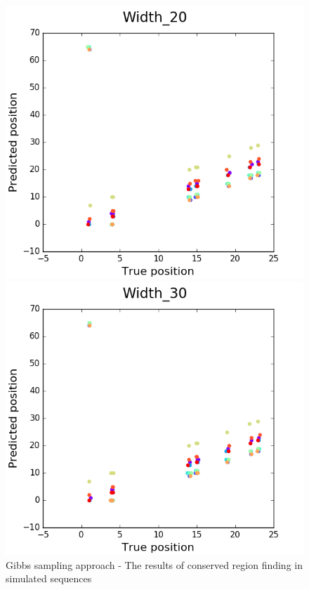 \documentclass[11pt, oneside]{article}
\begin{document}
\begin{figure}[htbp]
\begin{minipage}{0.32\textwidth}
  \end{minipage}
  \hfill
  \begin{minipage}{0.32\textwidth}
    \centering
    \includegraphics[width=\textwidth]{images/Width_20} %
  \end{minipage}
  \hfill
  \begin{minipage}{0.32\textwidth}
    \centering
    \includegraphics[width=\textwidth]{images/Width_30} %
  \end{minipage}
  \caption{Gibbs sampling approach - The results of conserved region finding in simulated sequences}
  \label{fig:proof}
\end{figure}
\end{document}

